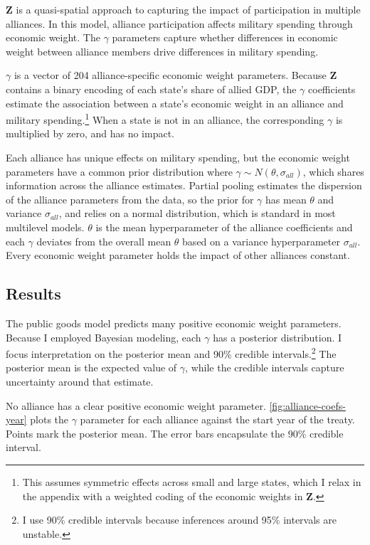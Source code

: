 \documentclass[12pt]{article}
\begin{document}
$\textbf{Z}$ is a quasi-spatial approach to capturing the impact of participation in multiple alliances.
In this model, alliance participation affects military spending through economic weight.  
The $\gamma$ parameters capture whether differences in economic weight between alliance members drive differences in military spending. 


$\gamma$ is a vector of 204 alliance-specific economic weight parameters.  
Because \textbf{Z} contains a binary encoding of each state's share of allied GDP, the $\gamma$ coefficients estimate the association between a state's economic weight in an alliance and military spending.\footnote{This assumes symmetric effects across small and large states, which I relax in the appendix with a weighted coding of the economic weights in $\textbf{Z}$.} 
When a state is not in an alliance, the corresponding $\gamma$ is multiplied by zero, and has no impact. 


Each alliance has unique effects on military spending, but the economic weight parameters have a common prior distribution where $\gamma \sim N(\theta, \sigma_{all})$, which shares information across the alliance estimates. 
Partial pooling estimates the dispersion of the alliance parameters from the data, so the prior for $\gamma$ has mean $\theta$ and variance $\sigma_{all}$, and relies on a normal distribution, which is standard in most multilevel models.  
$\theta$ is the mean hyperparameter of the alliance coefficients and each $\gamma$ deviates from the overall mean $\theta$ based on a variance hyperparameter $\sigma_{all}$.
Every economic weight parameter holds the impact of other alliances constant. 
    


\subsection{Results} 


The public goods model predicts many positive economic weight parameters. 
Because I employed Bayesian modeling, each $\gamma$ has a posterior distribution.
I focus interpretation on the posterior mean and 90\% credible intervals.\footnote{I use 90\% credible intervals because inferences around 95\% intervals are unstable.}
The posterior mean is the expected value of $\gamma$, while the credible intervals capture uncertainty around that estimate.  


No alliance has a clear positive economic weight parameter.
\autoref{fig:alliance-coefs-year} plots the $\gamma$ parameter for each alliance against the start year of the treaty.
Points mark the posterior mean. 
The error bars encapsulate the 90\% credible interval.
\end{document}
